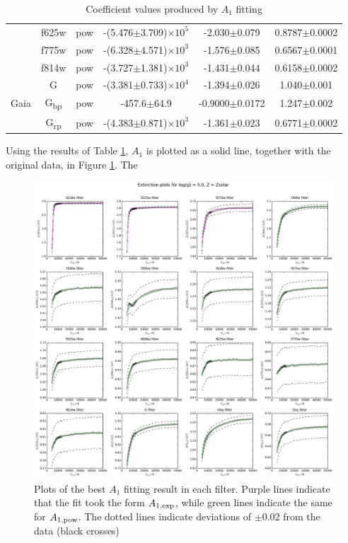 \documentclass[12pt, a4paper]{report}
\begin{document}
\begin{table}
\begin{center}
\begin{tabular}{cccccc}
& f625w & pow & -(5.476$\pm$3.709)$\times 10^{5}$ & -2.030$\pm$0.079 & 0.8787$\pm$0.0002 \\
& f775w & pow & -(6.328$\pm$4.571)$\times 10^{3}$ & -1.576$\pm$0.085 & 0.6567$\pm$0.0001 \\
& f814w & pow & -(3.727$\pm$1.381)$\times 10^{3}$ & -1.431$\pm$0.044 & 0.6158$\pm$0.0002 \\ \hline
& G & pow & -(3.381$\pm$0.733)$\times 10^{4}$ & -1.394$\pm$0.026 & 1.040$\pm$0.001 \\
Gaia & G\textsubscript{bp} & pow & -457.6$\pm$64.9 & -0.9000$\pm$0.0172 & 1.247$\pm$0.002 \\
& G\textsubscript{rp} & pow & -(4.383$\pm$0.871)$\times 10^{3}$ & -1.361$\pm$0.023 & 0.6771$\pm$0.0002 \\ \hline

\end{tabular}
\caption{Coefficient values produced by $A_{1}$ fitting}
\label{R1_coeffs_table}
\end{center}
\end{table}

Using the results of Table \ref{R1_coeffs_table}, $A_{1}$ is plotted as a solid line, together with the original data, in Figure \ref{R1_bests}. The

\begin{figure}
\begin{center}
\includegraphics[scale=0.4]{../HubWFC/Hub_graphs/AHub_logg=5p0_solar_4500K_R1_only_Teff_fit_modded_plot.pdf}
\caption{Plots of the best $A_{1}$ fitting result in each filter. Purple lines indicate that the fit took the form $A_{1,\textnormal{exp}}$, while green lines indicate the same for $A_{1,\textnormal{pow}}$. The dotted lines indicate deviations of $\pm$0.02 from the data (black crosses)}
\label{R1_bests}
\end{center}
\end{figure}
\end{document}
